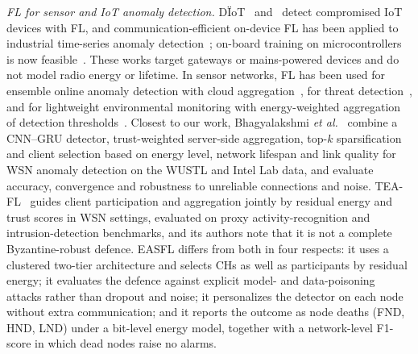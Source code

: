 \documentclass[journal]{IEEEtran}
\begin{document}

\textit{FL for sensor and IoT anomaly detection.} D\"IoT~\cite{nguyen2019diot} and~\cite{mothukuri2022} detect compromised IoT devices with FL, and communication-efficient on-device FL has been applied to industrial time-series anomaly detection~\cite{liu2021jiot}; on-board training on microcontrollers is now feasible~\cite{ficco2024}. These works target gateways or mains-powered devices and do not model radio energy or lifetime. In sensor networks, FL has been used for ensemble online anomaly detection with cloud aggregation~\cite{gayathri2024}, for threat detection~\cite{gupta2025}, and for lightweight environmental monitoring with energy-weighted aggregation of detection thresholds~\cite{yan2024lsens}. Closest to our work, Bhagyalakshmi \textit{et al.}~\cite{bhagyalakshmi2026} combine a CNN--GRU detector, trust-weighted server-side aggregation, top-$k$ sparsification and client selection based on energy level, network lifespan and link quality for WSN anomaly detection on the WUSTL and Intel Lab data, and evaluate accuracy, convergence and robustness to unreliable connections and noise. TEA-FL~\cite{reis2026} guides client participation and aggregation jointly by residual energy and trust scores in WSN settings, evaluated on proxy activity-recognition and intrusion-detection benchmarks, and its authors note that it is not a complete Byzantine-robust defence. EASFL differs from both in four respects: it uses a clustered two-tier architecture and selects CHs as well as participants by residual energy; it evaluates the defence against explicit model- and data-poisoning attacks rather than dropout and noise; it personalizes the detector on each node without extra communication; and it reports the outcome as node deaths (FND, HND, LND) under a bit-level energy model, together with a network-level F1-score in which dead nodes raise no alarms.
\end{document}
